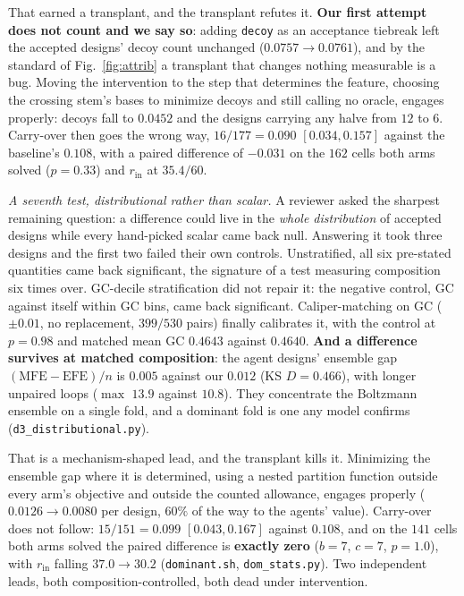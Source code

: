 \documentclass[11pt]{article}
\begin{document}
That earned a transplant, and the transplant refutes it. \textbf{Our first attempt does not count and we say
so}: adding \texttt{decoy} as an acceptance tiebreak left the accepted designs' decoy count unchanged
($0.0757\!\to\!0.0761$), and by the standard of Fig.~\ref{fig:attrib} a transplant that changes nothing
measurable is a bug. Moving the intervention to the step that determines the feature, choosing the crossing
stem's bases to minimize decoys and still calling no oracle, engages properly: decoys fall to $0.0452$ and the
designs carrying any halve from $12$ to $6$. Carry-over then goes the wrong way, $16/177=0.090$
$[0.034,0.157]$ against the baseline's $0.108$, with a paired difference of ${-}0.031$ on the $162$ cells both
arms solved ($p{=}0.33$) and $r_{\mathrm{in}}$ at $35.4/60$.

\emph{A seventh test, distributional rather than scalar.} A reviewer asked the sharpest remaining question: a
difference could live in the \emph{whole distribution} of accepted designs while every hand-picked scalar came
back null. Answering it took three designs and the first two failed their own controls. Unstratified, all six
pre-stated quantities came back significant, the signature of a test measuring composition six times over.
GC-decile stratification did not repair it: the negative control, GC against itself within GC bins, came back
significant. Caliper-matching on GC ($\pm0.01$, no replacement, $399/530$ pairs) finally calibrates it, with the
control at $p{=}0.98$ and matched mean GC $0.4643$ against $0.4640$. \textbf{And a difference survives at
matched composition}: the agent designs' ensemble gap $(\mathrm{MFE}-\mathrm{EFE})/n$ is $0.005$ against our
$0.012$ (KS $D{=}0.466$), with longer unpaired loops ($\max$ $13.9$ against $10.8$). They concentrate the
Boltzmann ensemble on a single fold, and a dominant fold is one any model confirms
(\texttt{d3\_distributional.py}).

That is a mechanism-shaped lead, and the transplant kills it. Minimizing the ensemble gap where it is
determined, using a nested partition function outside every arm's objective and outside the counted allowance,
engages properly ($0.0126\to0.0080$ per design, $60\%$ of the way to the agents' value). Carry-over does not
follow: $15/151=0.099$ $[0.043,0.167]$ against $0.108$, and on the $141$ cells both arms solved the paired
difference is \textbf{exactly zero} ($b{=}7$, $c{=}7$, $p{=}1.0$), with $r_{\mathrm{in}}$ falling $37.0\to30.2$
(\texttt{dominant.sh}, \texttt{dom\_stats.py}). Two independent leads, both composition-controlled, both dead
under intervention.
\end{document}
